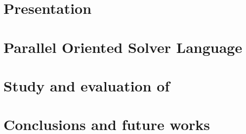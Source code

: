 \documentclass[a4paper,11pt,twoside,parskip=half,numbers=noenddot,bibliography=totocnumbered,listof = totoc]{scrbook}
\begin{document}

\frontmatter


\cleardoublepage
%

\cleardoublepage
\dominitoc
\tableofcontents
\cleardoublepage

\cleardoublepage

\cleardoublepage
%

\mainmatter

\part{Presentation}



\part{Parallel Oriented Solver Language}

\part{Study and evaluation of \posl}


\part{Conclusions and future works}

%

\footnotesize
{} %

\normalsize

%

%
\end{document}
